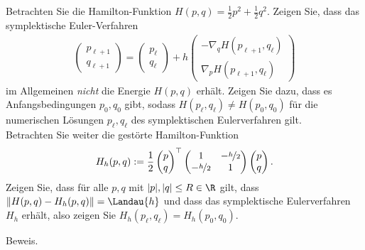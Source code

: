 \begin{exercise}
  Betrachten Sie die Hamilton-Funktion $H(p,q) = \frac{1}{2}p^2 + \frac{1}{2}q^2$.
  Zeigen Sie, dass das symplektische Euler-Verfahren
  \begin{align}
    \begin{pmatrix}
      p_{\ell + 1} \\ q_{\ell + 1}
    \end{pmatrix}
    = \begin{pmatrix}
      p_{\ell} \\ q_{\ell}
    \end{pmatrix} +
    h\begin{pmatrix}
      -\nabla_q H(p_{\ell + 1},q_{\ell}) \\
      \nabla_p H(p_{\ell + 1},q_{\ell})
    \end{pmatrix}
  \end{align}
  im Allgemeinen \textit{nicht} die Energie $H(p,q)$ erhält. Zeigen Sie dazu,
  dass es Anfangsbedingungen $p_0,q_0$ gibt, sodass $H(p_{\ell},q_{\ell})
  \neq H(p_0,q_0)$ für die numerischen Lösungen $p_{\ell},q_{\ell}$ des
  symplektischen Eulerverfahren gilt. \\
  Betrachten Sie weiter die gestörte Hamilton-Funktion
  \begin{align}
    H_h(p,q) := \frac{1}{2}\begin{pmatrix}
      p \\ q
    \end{pmatrix}^{\top}
    \begin{pmatrix}
      1 & - \nicefrac{h}{2} \\ -\nicefrac{h}{2} & 1
    \end{pmatrix}
    \begin{pmatrix}
      p \\ q
    \end{pmatrix}.
  \end{align}
  Zeigen Sie, dass für alle $p,q$ mit $|p|,|q| \leq R \in \R$ gilt, dass
  $\|H(p,q) - H_h(p,q)\| = \Landau{h}$ und dass das symplektische Eulerverfahren
  $H_h$ erhält, also zeigen Sie $H_h(p_{\ell},q_{\ell}) = H_h(p_0,q_0)$.
\end{exercise}

\begin{solution}
Beweis.
\end{solution}

